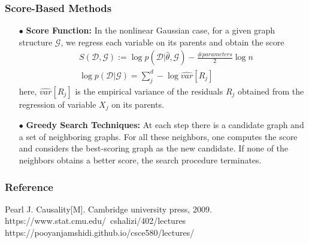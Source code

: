 \documentclass{beamer}
\begin{document}
\begin{frame}
    \frametitle{Score-Based Methods}
    \begin{itemize}
        \item[$\bullet$] \textbf{Score Function:} In the nonlinear Gaussian case, for a given graph structure $\mathcal{G}$, 
        we regress each variable on its parents and obtain the score
        \begin{align*}
            &S(\mathcal{D},\mathcal{G}):=\log p(\mathcal{D}|\hat{\theta},\mathcal{G}) - \frac{\#parameters}{2}\log n \\
            &\log p(\mathcal{D}|\mathcal{G})=\sum_j^d -\log \widehat{var}[R_j]
        \end{align*}
        here, $\widehat{var}[R_j]$ is the empirical variance of the residuals $R_j$ obtained from the regression of 
        variable $X_j$ on its parents. 
        \item[$\bullet$] \textbf{Greedy Search Techniques:} At each step there is a candidate graph and a set of
        neighboring graphs. For all these neighbors, one computes the score and considers
        the best-scoring graph as the new candidate. If none of the neighbors obtains a
        better score, the search procedure terminates.  
    \end{itemize}
\end{frame}

\begin{frame}
    \frametitle{Reference} 
    Pearl J. Causality[M]. Cambridge university press, 2009. \\
    https://www.stat.cmu.edu/~cshalizi/402/lectures \\
    https://pooyanjamshidi.github.io/csce580/lectures/ \\
\end{frame}
\end{document}
